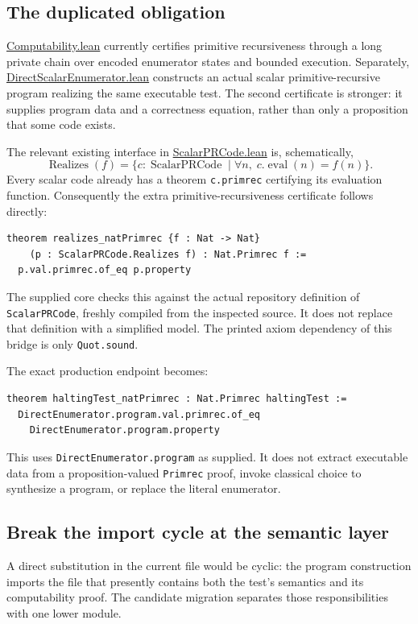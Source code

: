 \documentclass[11pt,a4paper]{article}
\newcommand{\code}[1]{\texttt{\small #1}}
\newcommand{\repo}{https://github.com/VladimirReshetnikov/ProveIt}
\newcommand{\pin}{60fcb2a69b7f1fdd4c3592ea5f164223cad50abe}
\newcommand{\src}[2]{\href{\repo/blob/\pin/Computability/DiophantineConsistency/Lean/DiophantineConsistency/#1.lean}{#2}}
\begin{document}
\subsection{The duplicated obligation}

\src{Computability}{Computability.lean} currently certifies primitive recursiveness through a long private chain over encoded enumerator states and bounded execution. Separately, \src{DirectScalarEnumerator}{DirectScalarEnumerator.lean} constructs an actual scalar primitive-recursive program realizing the same executable test. The second certificate is stronger: it supplies program data and a correctness equation, rather than only a proposition that some code exists.

The relevant existing interface in \src{ScalarPRCode}{ScalarPRCode.lean} is, schematically,
\[
 \operatorname{Realizes}(f)
 = \{c:\operatorname{ScalarPRCode}\mid\forall n,\;c.\operatorname{eval}(n)=f(n)\}.
\]
Every scalar code already has a theorem \code{c.primrec} certifying its evaluation function. Consequently the extra primitive-recursiveness certificate follows directly:
\begin{lstlisting}
theorem realizes_natPrimrec {f : Nat -> Nat}
    (p : ScalarPRCode.Realizes f) : Nat.Primrec f :=
  p.val.primrec.of_eq p.property
\end{lstlisting}
The supplied core checks this against the actual repository definition of \code{ScalarPRCode}, freshly compiled from the inspected source. It does not replace that definition with a simplified model. The printed axiom dependency of this bridge is only \code{Quot.sound}.

The exact production endpoint becomes:
\begin{lstlisting}
theorem haltingTest_natPrimrec : Nat.Primrec haltingTest :=
  DirectEnumerator.program.val.primrec.of_eq
    DirectEnumerator.program.property
\end{lstlisting}
This uses \code{DirectEnumerator.program} as supplied. It does not extract executable data from a proposition-valued \code{Primrec} proof, invoke classical choice to synthesize a program, or replace the literal enumerator.

\subsection{Break the import cycle at the semantic layer}

A direct substitution in the current file would be cyclic: the program construction imports the file that presently contains both the test's semantics and its computability proof. The candidate migration separates those responsibilities with one lower module.
\end{document}
